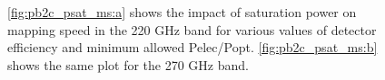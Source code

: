 \begin{figure}[!t]
    \caption[Impact of PB2c Psat on mapping speed for various detector efficiencies and minimum allowed value of Pelec/Popt]{\ref{fig:pb2c_psat_ms:a} shows the impact of saturation power on mapping speed in the 220 GHz band for various values of detector efficiency and minimum allowed Pelec/Popt. \ref{fig:pb2c_psat_ms:b} shows the same plot for the 270 GHz band.}
    \label{fig:pb2c_psat_ms}
\end{figure}